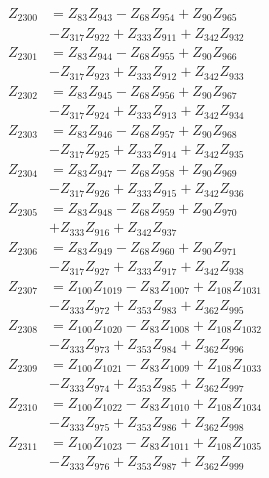 \begin{multicols}{2}
\begin{align}
Z_{2300} &= Z_{83}Z_{943} - Z_{68}Z_{954} + Z_{90}Z_{965}  \nonumber \\
&- Z_{317}Z_{922} + Z_{333}Z_{911} + Z_{342}Z_{932} \nonumber \\
Z_{2301} &= Z_{83}Z_{944} - Z_{68}Z_{955} + Z_{90}Z_{966}  \nonumber \\
&- Z_{317}Z_{923} + Z_{333}Z_{912} + Z_{342}Z_{933} \nonumber \\
Z_{2302} &= Z_{83}Z_{945} - Z_{68}Z_{956} + Z_{90}Z_{967}  \nonumber \\
&- Z_{317}Z_{924} + Z_{333}Z_{913} + Z_{342}Z_{934} \nonumber \\
Z_{2303} &= Z_{83}Z_{946} - Z_{68}Z_{957} + Z_{90}Z_{968}  \nonumber \\
&- Z_{317}Z_{925} + Z_{333}Z_{914} + Z_{342}Z_{935} \nonumber \\
Z_{2304} &= Z_{83}Z_{947} - Z_{68}Z_{958} + Z_{90}Z_{969}  \nonumber \\
&- Z_{317}Z_{926} + Z_{333}Z_{915} + Z_{342}Z_{936} \nonumber \\
Z_{2305} &= Z_{83}Z_{948} - Z_{68}Z_{959} + Z_{90}Z_{970}  \nonumber \\
&+ Z_{333}Z_{916} + Z_{342}Z_{937} \nonumber \\
Z_{2306} &= Z_{83}Z_{949} - Z_{68}Z_{960} + Z_{90}Z_{971}  \nonumber \\
&- Z_{317}Z_{927} + Z_{333}Z_{917} + Z_{342}Z_{938} \nonumber \\
Z_{2307} &= Z_{100}Z_{1019} - Z_{83}Z_{1007} + Z_{108}Z_{1031}  \nonumber \\
&- Z_{333}Z_{972} + Z_{353}Z_{983} + Z_{362}Z_{995} \nonumber \\
Z_{2308} &= Z_{100}Z_{1020} - Z_{83}Z_{1008} + Z_{108}Z_{1032}  \nonumber \\
&- Z_{333}Z_{973} + Z_{353}Z_{984} + Z_{362}Z_{996} \nonumber \\
Z_{2309} &= Z_{100}Z_{1021} - Z_{83}Z_{1009} + Z_{108}Z_{1033}  \nonumber \\
&- Z_{333}Z_{974} + Z_{353}Z_{985} + Z_{362}Z_{997} \nonumber \\
Z_{2310} &= Z_{100}Z_{1022} - Z_{83}Z_{1010} + Z_{108}Z_{1034}  \nonumber \\
&- Z_{333}Z_{975} + Z_{353}Z_{986} + Z_{362}Z_{998} \nonumber \\
Z_{2311} &= Z_{100}Z_{1023} - Z_{83}Z_{1011} + Z_{108}Z_{1035}  \nonumber \\
&- Z_{333}Z_{976} + Z_{353}Z_{987} + Z_{362}Z_{999} \nonumber \\

\end{align}
\end{multicols}
